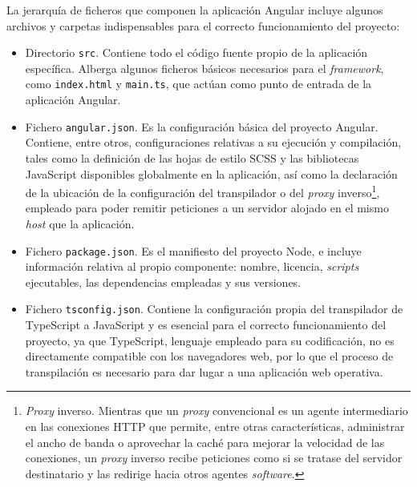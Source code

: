 La jerarquía de ficheros que componen la aplicación Angular incluye algunos archivos y carpetas indispensables para el correcto funcionamiento del proyecto:
\begin{itemize}
    \item Directorio \texttt{src}. Contiene todo el código fuente propio de la aplicación específica. Alberga algunos ficheros básicos necesarios para el \textit{framework}, como \texttt{index.html} y \texttt{main.ts}, que actúan como punto de entrada de la aplicación Angular.
    \item Fichero \texttt{angular.json}. Es la configuración básica del proyecto Angular. Contiene, entre otros, configuraciones relativas a su ejecución y compilación, tales como la definición de las hojas de estilo SCSS y las bibliotecas JavaScript disponibles globalmente en la aplicación, así como la declaración de la ubicación de la configuración del transpilador o del \textit{proxy} inverso\footnote{\textit{Proxy} inverso. Mientras que un \textit{proxy} convencional es un agente intermediario en las conexiones HTTP que permite, entre otras características, administrar el ancho de banda o aprovechar la caché para mejorar la velocidad de las conexiones, un \textit{proxy} inverso recibe peticiones como si se tratase del servidor destinatario y las redirige hacia otros agentes \textit{software}.}, empleado para poder remitir peticiones a un servidor alojado en el mismo \textit{host} que la aplicación.
    \item Fichero \texttt{package.json}. Es el manifiesto del proyecto Node, e incluye información relativa al propio componente: nombre, licencia, \textit{scripts} ejecutables, las dependencias empleadas y sus versiones.
    \item Fichero \texttt{tsconfig.json}. Contiene la configuración propia del transpilador de TypeScript a JavaScript y es esencial para el correcto funcionamiento del proyecto, ya que TypeScript, lenguaje empleado para su codificación, no es directamente compatible con los navegadores web, por lo que el proceso de transpilación es necesario para dar lugar a una aplicación web operativa.
\end{itemize}

